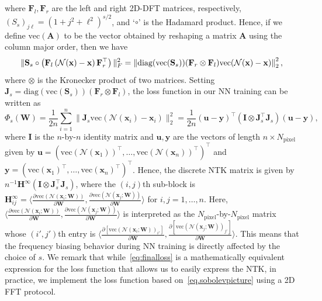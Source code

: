 where $\mathbf{F}_l, \mathbf{F}_r$ are the left and right 2D-DFT matrices, respectively, $(S_s)_{j\ell} = (1+j^2+\ell^2)^{s/2}$, and `$\circ$' is the Hadamard product. Hence, if we define $\text{vec}(\mathbf{A})$ to be the vector obtained by reshaping a matrix $\mathbf{A}$ using the column major order, then we have
\begin{equation*}
    \| \mathbf{S}_s \circ \left(\mathbf{F}_l \left( \mathcal{N}(\mathbf{x})- \mathbf{x}\right) \mathbf{F}_r^\top\right) \|_F^2 = \left\lVert\text{diag}(\text{vec}(\mathbf{S}_s)) (\mathbf{F}_r \otimes \mathbf{F}_l) \text{vec}(\mathcal{N}(\mathbf{x})- \mathbf{x})\right\rVert^2_2,
\end{equation*}
where $\otimes$ is the Kronecker product of two matrices. Setting $\mathbf{J}_s = \text{diag}(\text{vec}(\mathbf{S}_s)) (\mathbf{F}_r \otimes \mathbf{F}_l)$, the loss function in our NN training can be written as
\begin{equation} 
    \Phi_s(\mathbf{W}) = \frac{1}{2n} \sum_{i=1}^n \| \mathbf{J}_s \text{vec}\left(\mathcal{N}(\mathbf{x}_i)- \mathbf{x}_i\right) \|_2^2 = \frac{1}{2n} (\mathbf{u} - \mathbf{y})^\top (\mathbf{I} \otimes \mathbf{J}_s^\top \mathbf{J}_s) (\mathbf{u} - \mathbf{y}),
\label{eq:finalloss} 
\end{equation}
where $\mathbf{I}$ is the $n$-by-$n$ identity matrix and $\mathbf{u}, \mathbf{y}$ are the vectors of length $n \times N_{\text{pixel}}$ given by $\mathbf{u} = (\text{vec}(\mathcal{N}(\mathbf{x}_1))^\top, \ldots, \text{vec}(\mathcal{N}(\mathbf{x}_n))^\top)^\top$ and $\mathbf{y} = (\text{vec}(\mathbf{x}_1)^\top, \ldots, \text{vec}(\mathbf{x}_n)^\top)^\top$. Hence, the discrete NTK matrix is given by $n^{-1}\mathbf{H}^\infty (\mathbf{I} \otimes \mathbf{J}_s^\top \mathbf{J}_s)$, where the $(i,j)$th sub-block is $\mathbf{H}^\infty_{ij} = \big \langle \frac{\partial \text{vec}(\mathcal{N}(\mathbf{x}_i;\mathbf{W})) }{\partial \mathbf{W}},\frac{\partial \text{vec}(\mathcal{N}(\mathbf{x}_j;\mathbf{W}))}{\partial \mathbf{W}}  \big \rangle$ for $i, j = 1, \ldots, n$. Here, $\big \langle \frac{\partial \text{vec}(\mathcal{N}(\mathbf{x}_i;\mathbf{W})) }{\partial \mathbf{W}},\frac{\partial \text{vec}(\mathcal{N}(\mathbf{x}_j;\mathbf{W}))}{\partial \mathbf{W}}  \big \rangle$ is interpreted as the $N_{\text{pixel}}$-by-$N_{\text{pixel}}$ matrix whose $(i',j')$th entry is $\big \langle \frac{\partial [\text{vec}(\mathcal{N}(\mathbf{x}_i;\mathbf{W}))_{i'}] }{\partial \mathbf{W}},\frac{\partial [\text{vec}(\mathcal{N}(\mathbf{x}_j;\mathbf{W}))_{j'}]}{\partial \mathbf{W}}  \big \rangle$. This means that the frequency biasing behavior during NN training is directly affected by the choice of $s$. We remark that while~\cref{eq:finalloss} is a mathematically equivalent expression for the loss function that allows us to easily express the NTK, in practice, we implement the loss function based on~\cref{eq.sobolevpicture} using a 2D FFT protocol.

